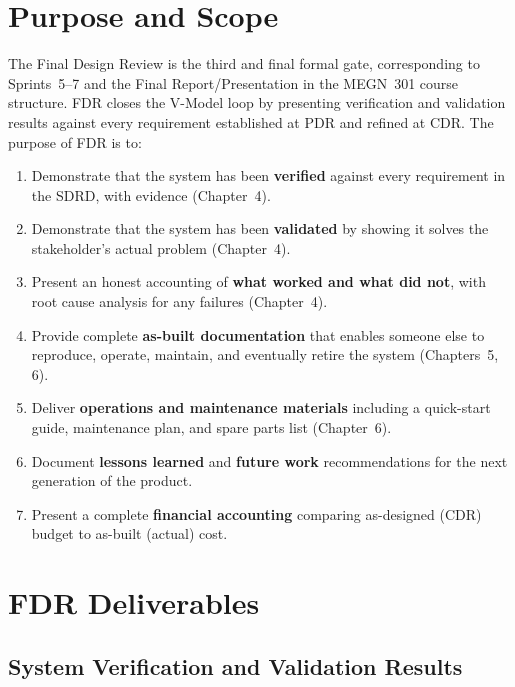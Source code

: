 \documentclass[11pt,letterpaper,twoside,openany]{book}
\begin{document}
\vspace{1em}

\FloatBarrier
\section{Purpose and Scope}

The Final Design Review is the third and final formal gate, corresponding to Sprints~5--7 and the Final Report/Presentation in the MEGN~301 course structure. FDR closes the V-Model loop by presenting verification and validation results against every requirement established at PDR and refined at CDR. The purpose of FDR is to:

\begin{enumerate}[leftmargin=1.5em]
\item Demonstrate that the system has been \textbf{verified} against every requirement in the SDRD, with evidence (Chapter~4).
\item Demonstrate that the system has been \textbf{validated} by showing it solves the stakeholder's actual problem (Chapter~4).
\item Present an honest accounting of \textbf{what worked and what did not}, with root cause analysis for any failures (Chapter~4).
\item Provide complete \textbf{as-built documentation} that enables someone else to reproduce, operate, maintain, and eventually retire the system (Chapters~5, 6).
\item Deliver \textbf{operations and maintenance materials} including a quick-start guide, maintenance plan, and spare parts list (Chapter~6).
\item Document \textbf{lessons learned} and \textbf{future work} recommendations for the next generation of the product.
\item Present a complete \textbf{financial accounting} comparing as-designed (CDR) budget to as-built (actual) cost.
\end{enumerate}

\FloatBarrier
\section{FDR Deliverables}

\subsection{System Verification and Validation Results}
\end{document}
